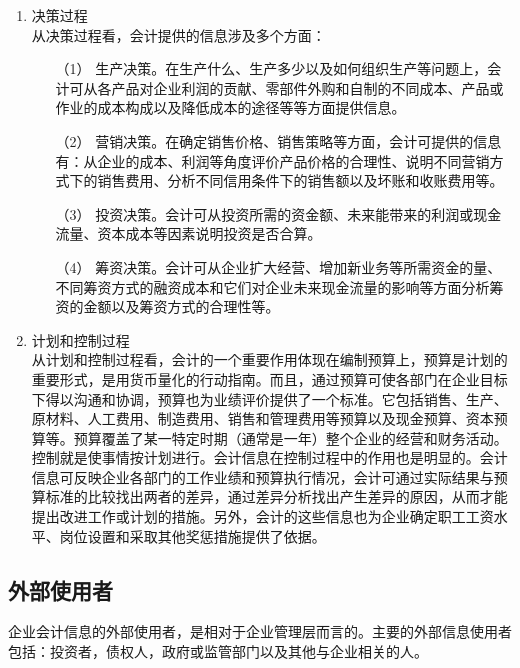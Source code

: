 		\begin{enumerate}
			\item 决策过程 \\
						从决策过程看，会计提供的信息涉及多个方面：
						\begin{enumerate}
							\item[（1）] 生产决策。在生产什么、生产多少以及如何组织生产等问题上，会计可从各产品对企业利润的贡献、零部件外购和自制的不同成本、产品或作业的成本构成以及降低成本的途径等等方面提供信息。
							\item[（2）] 营销决策。在确定销售价格、销售策略等方面，会计可提供的信息有：从企业的成本、利润等角度评价产品价格的合理性、说明不同营销方式下的销售费用、分析不同信用条件下的销售额以及坏账和收账费用等。
							\item[（3）] 投资决策。会计可从投资所需的资金额、未来能带来的利润或现金流量、资本成本等因素说明投资是否合算。
							\item[（4）] 筹资决策。会计可从企业扩大经营、增加新业务等所需资金的量、不同筹资方式的融资成本和它们对企业未来现金流量的影响等方面分析筹资的金额以及筹资方式的合理性等。
						\end{enumerate}
			\item 计划和控制过程 \\
						从计划和控制过程看，会计的一个重要作用体现在编制预算上，预算是计划的重要形式，是用货币量化的行动指南。而且，通过预算可使各部门在企业目标下得以沟通和协调，预算也为业绩评价提供了一个标准。它包括销售、生产、原材料、人工费用、制造费用、销售和管理费用等预算以及现金预算、资本预算等。预算覆盖了某一特定时期（通常是一年）整个企业的经营和财务活动。控制就是使事情按计划进行。会计信息在控制过程中的作用也是明显的。会计信息可反映企业各部门的工作业绩和预算执行情况，会计可通过实际结果与预算标准的比较找出两者的差异，通过差异分析找出产生差异的原因，从而才能提出改进工作或计划的措施。另外，会计的这些信息也为企业确定职工工资水平、岗位设置和采取其他奖惩措施提供了依据。
		\end{enumerate}

		\subsection{外部使用者}

		企业会计信息的外部使用者，是相对于企业管理层而言的。主要的外部信息使用者包括：投资者，债权人，政府或监管部门以及其他与企业相关的人。

